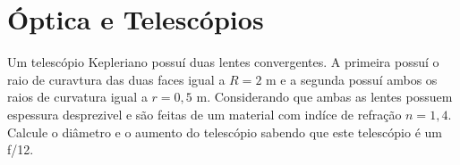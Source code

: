 \documentclass[11pt]{article}
\begin{document}
\newpage

\newpage

\section{Óptica e Telescópios}

    \begin{pproblem} Um telescópio Kepleriano possuí duas lentes convergentes. A primeira possuí o raio de curavtura das duas faces igual a \(R = 2\text{ m}\) e a segunda possuí ambos os raios de curvatura igual a \(r = 0,5 \text{ m}\). Considerando que ambas as lentes possuem espessura desprezivel e são feitas de um material com indíce de refração \(n=1,4\). Calcule o diâmetro e o aumento do telescópio sabendo que este telescópio é um f/12.
    \end{pproblem}
\end{document}
